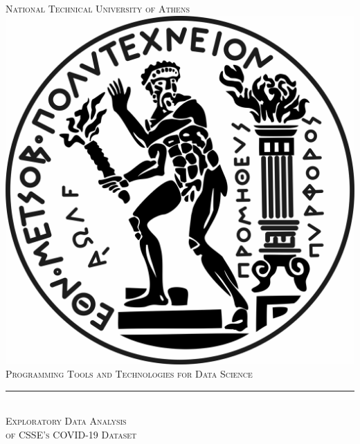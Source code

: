 \hypersetup{
	colorlinks,
	citecolor = black,
	filecolor = black,
	linkcolor = black,
	urlcolor = blue
}

\usepackage{minted}



	\begin{titlepage}
		\newcommand{\HRule}{\rule{\linewidth}{0.1mm}}
		\center
		\textsc{\Large National Technical University of Athens}\\[0.5cm]
		\vspace{1cm}
		\includegraphics[scale=0.2]{images/pyrforos.jpg}\\[1cm]
		\textsc{\large Programming Tools and Technologies for Data Science}\\[0.5cm]

		\HRule \\[0.2cm]

		\textsc{\Large Exploratory Data Analysis \\ \large of CSSE's COVID-19 Dataset}\\


\end{titlepage}
